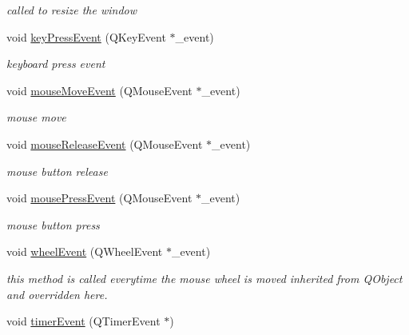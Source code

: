 \begin{DoxyCompactItemize}
\begin{DoxyCompactList}\small\item\em called to resize the window \end{DoxyCompactList}\item 
\hypertarget{class_open_g_l_widget_a2e7ec0372fb6b2a0eb85a9524cfdd7fd}{void \hyperlink{class_open_g_l_widget_a2e7ec0372fb6b2a0eb85a9524cfdd7fd}{key\-Press\-Event} (Q\-Key\-Event $\ast$\-\_\-event)}\label{class_open_g_l_widget_a2e7ec0372fb6b2a0eb85a9524cfdd7fd}

\begin{DoxyCompactList}\small\item\em keyboard press event \end{DoxyCompactList}\item 
\hypertarget{class_open_g_l_widget_aa6d543f552c813df3b3a78dc5c4899fd}{void \hyperlink{class_open_g_l_widget_aa6d543f552c813df3b3a78dc5c4899fd}{mouse\-Move\-Event} (Q\-Mouse\-Event $\ast$\-\_\-event)}\label{class_open_g_l_widget_aa6d543f552c813df3b3a78dc5c4899fd}

\begin{DoxyCompactList}\small\item\em mouse move \end{DoxyCompactList}\item 
\hypertarget{class_open_g_l_widget_aa3f5541e5da2d5c52ca16b99f40dfd75}{void \hyperlink{class_open_g_l_widget_aa3f5541e5da2d5c52ca16b99f40dfd75}{mouse\-Release\-Event} (Q\-Mouse\-Event $\ast$\-\_\-event)}\label{class_open_g_l_widget_aa3f5541e5da2d5c52ca16b99f40dfd75}

\begin{DoxyCompactList}\small\item\em mouse button release \end{DoxyCompactList}\item 
\hypertarget{class_open_g_l_widget_adaab83f0bed689b0765d42b6ae760220}{void \hyperlink{class_open_g_l_widget_adaab83f0bed689b0765d42b6ae760220}{mouse\-Press\-Event} (Q\-Mouse\-Event $\ast$\-\_\-event)}\label{class_open_g_l_widget_adaab83f0bed689b0765d42b6ae760220}

\begin{DoxyCompactList}\small\item\em mouse button press \end{DoxyCompactList}\item 
void \hyperlink{class_open_g_l_widget_a0682546d360b7ce9ae1dce31a090cfca}{wheel\-Event} (Q\-Wheel\-Event $\ast$\-\_\-event)
\begin{DoxyCompactList}\small\item\em this method is called everytime the mouse wheel is moved inherited from Q\-Object and overridden here. \end{DoxyCompactList}\item 
\hypertarget{class_open_g_l_widget_a11473cec64e843211458fd83f9d6ad72}{void \hyperlink{class_open_g_l_widget_a11473cec64e843211458fd83f9d6ad72}{timer\-Event} (Q\-Timer\-Event $\ast$)}\label{class_open_g_l_widget_a11473cec64e843211458fd83f9d6ad72}


\end{DoxyCompactItemize}
